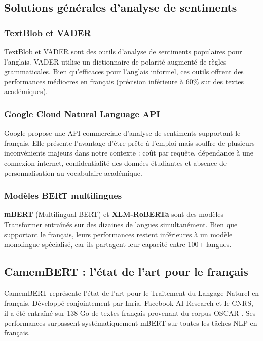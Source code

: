 \subsection{Solutions générales d'analyse de sentiments}

\subsubsection{TextBlob et VADER}

TextBlob et VADER sont des outils d'analyse de sentiments populaires pour
l'anglais. VADER utilise un dictionnaire de polarité augmenté de règles
grammaticales. Bien qu'efficaces pour l'anglais informel, ces outils offrent
des performances médiocres en français (précision inférieure à 60\% sur
des textes académiques).

\subsubsection{Google Cloud Natural Language API}

Google propose une API commerciale d'analyse de sentiments supportant
le français. Elle présente l'avantage d'être prête à l'emploi mais souffre
de plusieurs inconvénients majeurs dans notre contexte : coût par requête,
dépendance à une connexion internet, confidentialité des données étudiantes
et absence de personnalisation au vocabulaire académique.

\subsubsection{Modèles BERT multilingues}

\textbf{mBERT} (Multilingual BERT) et \textbf{XLM-RoBERTa} sont des modèles
Transformer entraînés sur des dizaines de langues simultanément. Bien que
supportant le français, leurs performances restent inférieures à un modèle
monolingue spécialisé, car ils partagent leur capacité entre 100+ langues.

\subsection{CamemBERT : l'état de l'art pour le français}

CamemBERT \cite{martin2020camembert} représente l'état de l'art pour le
Traitement du Langage Naturel en français. Développé conjointement par
Inria, Facebook AI Research et le CNRS, il a été entraîné sur 138 Go de
textes français provenant du corpus OSCAR \cite{ortiz2019oscar}. Ses
performances surpassent systématiquement mBERT sur toutes les tâches NLP
en français.

